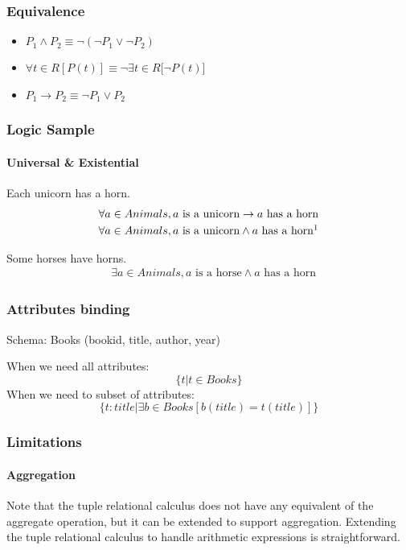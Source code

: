 \documentclass{beamer}
\begin{document}
\begin{frame}
  \frametitle{Equivalence}
  \begin{itemize}
  \item $P_1 \wedge P_2 \equiv \neg (\neg P_1 \vee \neg P_2)$
  \item $\forall t \in R[P(t)] \equiv \neg \exists t \in R [\neg P(t)$]
  \item $P_1 \rightarrow P_2 \equiv \neg P_1 \vee P_2$
  \end{itemize}
\end{frame}

\begin{frame}[fragile]
  \frametitle{Logic Sample}
  \framesubtitle{Universal \& Existential}
  Each unicorn has a horn. 
  \begin{align*}
  &\forall a \in Animals, a \text{ is a unicorn} \rightarrow a \text{ has a horn} \\
  &\forall a \in Animals, a \text{ is a unicorn} \wedge a \text{ has a horn} \footnotemark
  \end{align*}

  Some horses have horns. 
  \begin{align*}
  &\exists a \in Animals, a \text{ is a horse} \wedge a \text{ has a horn}
  \end{align*}
\end{frame}
\begin{frame}
  \frametitle{Attributes binding}
  Schema: Books (bookid, title, author, year)
  
  When we need all attributes:
  $$
  \{t|t\in Books\}
  $$
  When we need to subset of attributes:
  $$
  \{t:title| \exists b\in Books[b(title)=t(title)]\}
  $$
  
\end{frame}

\begin{frame}
  \frametitle{Limitations}
  \framesubtitle{Aggregation}
  Note that the tuple relational calculus does not have any equivalent of the aggregate
operation, but it can be extended to support aggregation. Extending the tuple relational
calculus to handle arithmetic expressions is straightforward.
\end{frame}
\end{document}
